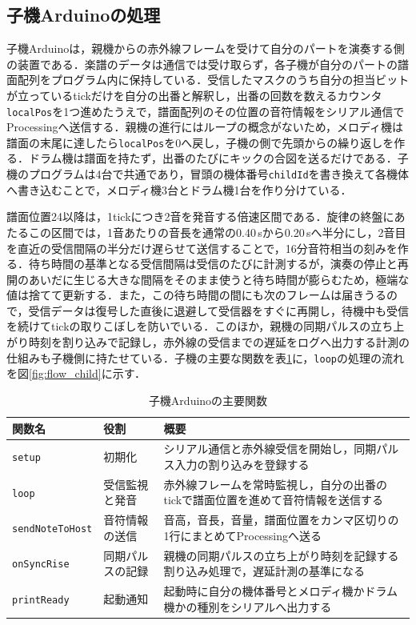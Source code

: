\subsection{子機Arduinoの処理}

子機Arduinoは，親機からの赤外線フレームを受けて自分のパートを演奏する側の装置である．楽譜のデータは通信では受け取らず，各子機が自分のパートの譜面配列をプログラム内に保持している．受信したマスクのうち自分の担当ビットが立っているtickだけを自分の出番と解釈し，出番の回数を数えるカウンタ\texttt{localPos}を1つ進めたうえで，譜面配列のその位置の音符情報をシリアル通信でProcessingへ送信する．親機の進行にはループの概念がないため，メロディ機は譜面の末尾に達したら\texttt{localPos}を0へ戻し，子機の側で先頭からの繰り返しを作る．ドラム機は譜面を持たず，出番のたびにキックの合図を送るだけである．子機のプログラムは4台で共通であり，冒頭の機体番号\texttt{childId}を書き換えて各機体へ書き込むことで，メロディ機3台とドラム機1台を作り分けている．

譜面位置24以降は，1tickにつき2音を発音する倍速区間である．旋律の終盤にあたるこの区間では，1音あたりの音長を通常の0.40\,sから0.20\,sへ半分にし，2音目を直近の受信間隔の半分だけ遅らせて送信することで，16分音符相当の刻みを作る．待ち時間の基準となる受信間隔は受信のたびに計測するが，演奏の停止と再開のあいだに生じる大きな間隔をそのまま使うと待ち時間が膨らむため，極端な値は捨てて更新する．また，この待ち時間の間にも次のフレームは届きうるので，受信データは復号した直後に退避して受信器をすぐに再開し，待機中も受信を続けてtickの取りこぼしを防いでいる．このほか，親機の同期パルスの立ち上がり時刻を割り込みで記録し，赤外線の受信までの遅延をログへ出力する計測の仕組みも子機側に持たせている．子機の主要な関数を表\ref{tab:func_child}に，\texttt{loop}の処理の流れを図\ref{fig:flow_child}に示す．

\begin{table}[tb]
\caption{子機Arduinoの主要関数}
\label{tab:func_child}
\begin{center}
\small
\begin{tabular}{llp{15em}}
\hline
関数名 & 役割 & 概要 \\
\hline
\texttt{setup} & 初期化 & シリアル通信と赤外線受信を開始し，同期パルス入力の割り込みを登録する \\
\texttt{loop} & 受信監視と発音 & 赤外線フレームを常時監視し，自分の出番のtickで譜面位置を進めて音符情報を送信する \\
\texttt{sendNoteToHost} & 音符情報の送信 & 音高，音長，音量，譜面位置をカンマ区切りの1行にまとめてProcessingへ送る \\
\texttt{onSyncRise} & 同期パルスの記録 & 親機の同期パルスの立ち上がり時刻を記録する割り込み処理で，遅延計測の基準になる \\
\texttt{printReady} & 起動通知 & 起動時に自分の機体番号とメロディ機かドラム機かの種別をシリアルへ出力する \\
\hline
\end{tabular}
\end{center}
\end{table}

